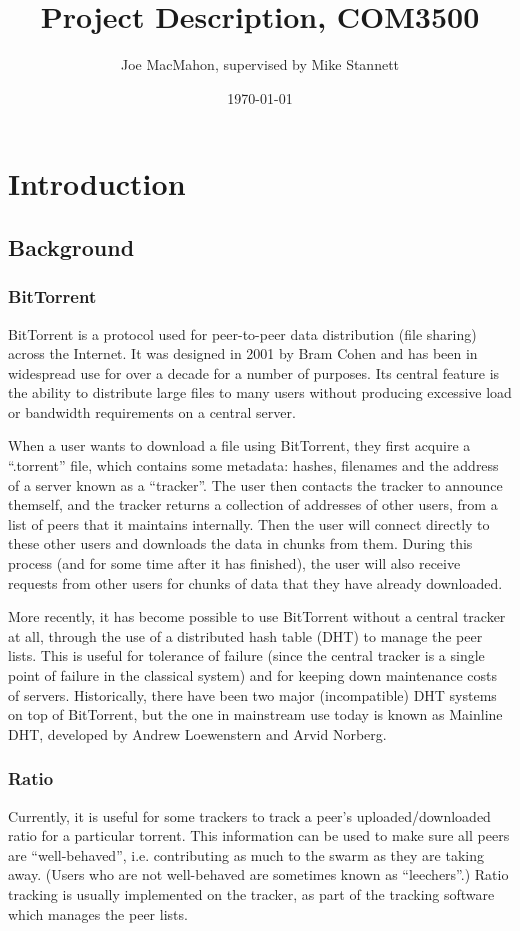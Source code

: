 \documentclass{article}
\title{Project Description, COM3500}
\author{Joe MacMahon, supervised by Mike Stannett}
\date{\today}
\begin{document}
\maketitle

\section{Introduction}
\subsection{Background}
\subsubsection{BitTorrent}
BitTorrent is a protocol used for peer-to-peer data distribution (file sharing) across the Internet.  It was designed in 2001 by Bram Cohen and has been in widespread use for over a decade for a number of purposes.  Its central feature is the ability to distribute large files to many users without producing excessive load or bandwidth requirements on a central server.

When a user wants to download a file using BitTorrent, they first acquire a ``.torrent'' file, which contains some metadata: hashes, filenames and the address of a server known as a ``tracker''.  The user then contacts the tracker to announce themself, and the tracker returns a collection of addresses of other users, from a list of peers that it maintains internally.  Then the user will connect directly to these other users and downloads the data in chunks from them.  During this process (and for some time after it has finished), the user will also receive requests from other users for chunks of data that they have already downloaded.

More recently, it has become possible to use BitTorrent without a central tracker at all, through the use of a distributed hash table (DHT) to manage the peer lists.  This is useful for tolerance of failure (since the central tracker is a single point of failure in the classical system) and for keeping down maintenance costs of servers.  Historically, there have been two major (incompatible) DHT systems on top of BitTorrent, but the one in mainstream use today is known as Mainline DHT, developed by Andrew Loewenstern and Arvid Norberg.

\subsubsection{Ratio}
Currently, it is useful for some trackers to track a peer's uploaded/downloaded ratio for a particular torrent.  This information can be used to make sure all peers are ``well-behaved'', i.e. contributing as much to the swarm as they are taking away.  (Users who are not well-behaved are sometimes known as ``leechers''.)  Ratio tracking is usually implemented on the tracker, as part of the tracking software which manages the peer lists.
\end{document}
